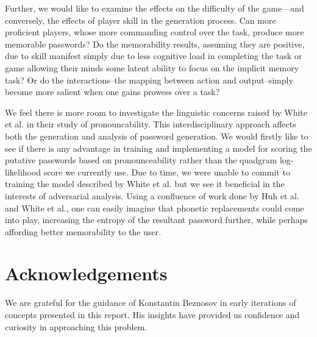 \documentclass[conference]{IEEEtran}
\begin{document}
Further, we would like to examine the effects on the difficulty of the game---and conversely, the effects of player skill in the generation process. Can more proficient players, whose more commanding control over the task, produce more memorable passwords? Do the memorability results, assuming they are positive, due to skill manifest simply due to less cognitive load in completing the task or game allowing their minds some latent ability to focus on the implicit memory task? Or do the interactions--the mapping between action and output--simply become more salient when one gains prowess over a task?

We feel there is more room to investigate the linguistic concerns raised by White et al. \cite{report:prounounceability} in their study of pronouncability. This interdisciplinary approach affects both the generation and analysis of password generation. We would firstly like to see if there is any advantage in training and implementing a model for scoring the putative passwords based on pronounceability rather than the quadgram log-likelihood score we currently use. Due to time, we were unable to commit to training the model described by White et al. but we see it beneficial in the interests of adversarial analysis. Using a confluence of work done by Huh et al. \cite{report:surpass} and White et al., one can easily imagine that phonetic replacements could come into play, increasing the entropy of the resultant password further, while perhaps affording better memorability to the user.

\section{Acknowledgements}
We are grateful for the guidance of Konstantin Beznosov in early iterations of concepts presented in this report. His insights have provided us confidence and curiosity in approaching this problem. 



\end{document}
